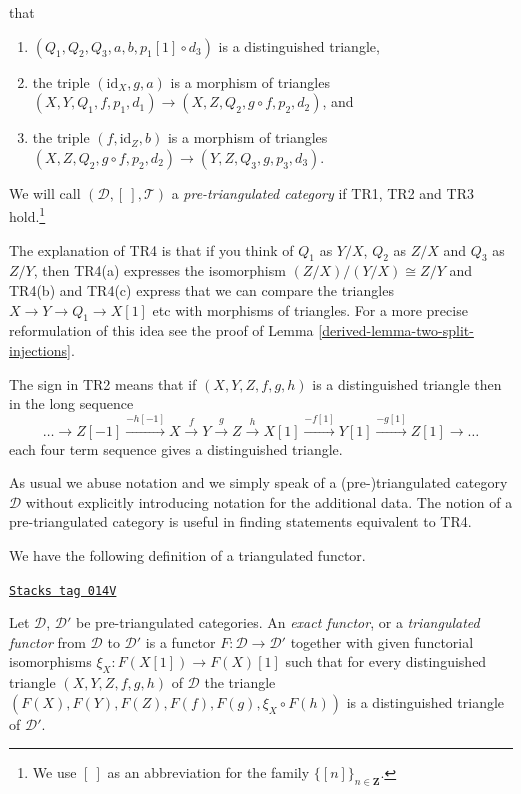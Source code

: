 \begin{definition}
\begin{enumerate}
that
\begin{enumerate}
\item $(Q_1, Q_2, Q_3, a, b, p_1[1] \circ d_3)$ is a
distinguished triangle,
\item the triple $(\text{id}_X, g, a)$ is
a morphism of triangles
$(X, Y, Q_1, f, p_1, d_1) \to (X, Z, Q_2, g \circ f, p_2, d_2)$, and
\item the triple $(f, \text{id}_Z, b)$ is a morphism of triangles
$(X, Z, Q_2, g \circ f, p_2, d_2) \to (Y, Z, Q_3, g, p_3, d_3)$.
\end{enumerate}
\end{enumerate}
We will call $(\mathcal{D}, [\ ], \mathcal{T})$ a
{\it pre-triangulated category} if TR1, TR2 and TR3
hold.\footnote{We use $[\ ]$ as an abbreviation for the
family $\{[n]\}_{n\in \mathbf{Z}}$.}
\end{definition}

The explanation of TR4 is that if you think of $Q_1$ as
$Y/X$, $Q_2$ as $Z/X$ and $Q_3$ as $Z/Y$, then TR4(a) expresses
the isomorphism $(Z/X)/(Y/X) \cong Z/Y$ and TR4(b) and TR4(c)
express that we can compare the triangles $X \to Y \to Q_1 \to X[1]$
etc with morphisms of triangles. For a more precise reformulation
of this idea see the proof of Lemma \ref{derived-lemma-two-split-injections}.

\medskip\noindent
The sign in TR2 means that if $(X, Y, Z, f, g, h)$ is a distinguished triangle
then in the long sequence
\begin{equation}
\label{equation-rotate}
\ldots \to
Z[-1] \xrightarrow{-h[-1]}
X \xrightarrow{f}
Y \xrightarrow{g}
Z \xrightarrow{h}
X[1] \xrightarrow{-f[1]}
Y[1] \xrightarrow{-g[1]}
Z[1] \to \ldots
\end{equation}
each four term sequence gives a distinguished triangle.

\medskip\noindent
As usual we abuse notation and we simply speak of a (pre-)triangulated
category $\mathcal{D}$ without explicitly introducing notation for the
additional data. The notion of a pre-triangulated category is
useful in finding statements equivalent to TR4.

\medskip\noindent
We have the following definition of a triangulated functor.

\begin{definition}
\label{derived-definition-exact-functor-triangulated-categories}
\href{https://stacks.math.columbia.edu/tag/014V}{\texttt{Stacks tag 014V}}

Let $\mathcal{D}$, $\mathcal{D}'$ be pre-triangulated
categories. An {\it exact functor}, or a {\it triangulated functor}
from $\mathcal{D}$ to $\mathcal{D}'$ is a functor
$F : \mathcal{D} \to \mathcal{D}'$ together
with given functorial isomorphisms $\xi_X : F(X[1]) \to F(X)[1]$
such that for every distinguished triangle
$(X, Y, Z, f, g, h)$ of $\mathcal{D}$ the triangle
$(F(X), F(Y), F(Z), F(f), F(g), \xi_X \circ F(h))$
is a distinguished triangle of $\mathcal{D}'$.
\end{definition}

